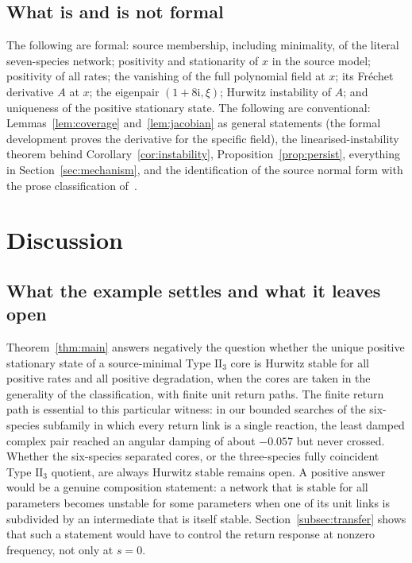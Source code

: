 \documentclass[11pt,a4paper]{article}
\theoremstyle{plain}
\theoremstyle{definition}
\theoremstyle{remark}
\numberwithin{equation}{section}
\newcommand{\II}{\mathrm{II}}
\newcommand{\iu}{\mathrm{i}}
\begin{document}
\subsection*{What is and is not formal}
The following are formal: source membership, including minimality, of the literal seven-species network; positivity and stationarity of $x$ in the source model; positivity of all rates; the vanishing of the full polynomial field at $x$; its Fr\'echet derivative $A$ at $x$; the eigenpair $(1+8\iu,\xi)$; Hurwitz instability of $A$; and uniqueness of the positive stationary state. The following are conventional: Lemmas~\ref{lem:coverage} and~\ref{lem:jacobian} as general statements (the formal development proves the derivative for the specific field), the linearised-instability theorem behind Corollary~\ref{cor:instability}, Proposition~\ref{prop:persist}, everything in Section~\ref{sec:mechanism}, and the identification of the source normal form with the prose classification of~\cite{NNU26}.

\section{Discussion}\label{sec:discussion}

\subsection*{What the example settles and what it leaves open}
Theorem~\ref{thm:main} answers negatively the question whether the unique positive stationary state of a source-minimal Type $\II_3$ core is Hurwitz stable for all positive rates and all positive degradation, when the cores are taken in the generality of the classification, with finite unit return paths. The finite return path is essential to this particular witness: in our bounded searches of the six-species subfamily in which every return link is a single reaction, the least damped complex pair reached an angular damping of about $-0.057$ but never crossed. Whether the six-species separated cores, or the three-species fully coincident Type $\II_3$ quotient, are always Hurwitz stable remains open. A positive answer would be a genuine composition statement: a network that is stable for all parameters becomes unstable for some parameters when one of its unit links is subdivided by an intermediate that is itself stable. Section~\ref{subsec:transfer} shows that such a statement would have to control the return response at nonzero frequency, not only at $s=0$.
\end{document}
